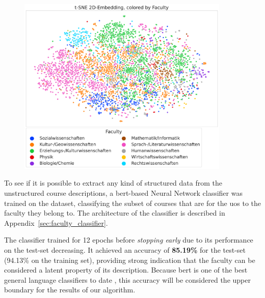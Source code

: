 \begin{figure}[h]
	\begin{center}
	  \includegraphics[width=0.9\textwidth]{graphics/dataset_new/scatter_mds_tsne_e2a70a9bf2.pdf}
	  \label{fig:scatter_mds_siddata}
	\end{center}
\end{figure}

To see if it is possible to extract any kind of structured data from the unstructured course descriptions, a \gls{bert}-based Neural Network classifier was trained on the dataset, classifying the subset of courses that are for the \gls{uos} to the faculty they belong to. The architecture of the classifier is described in Appendix~\ref{sec:faculty_classifier}.

The classifier trained for 12 epochs before \emph{stopping early} due to its performance on the test-set decreasing. It achieved an accuracy of \textbf{85.19\%} for the test-set (94.13\% on the training set), providing strong indication that the faculty can be considered a latent property of its description. Because \gls{bert} is one of the best general language classifiers to date \cite{Devlin2019}, this accuracy will be considered the upper boundary for the results of our algorithm.

